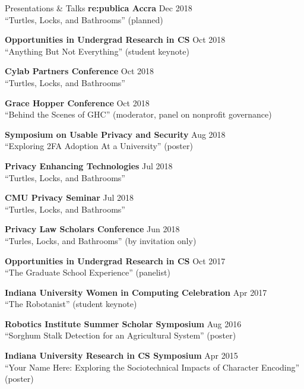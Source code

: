 \documentclass{resume} %
\begin{document}
\begin{rSection}{Presentations \& Talks}
	{\bf re:publica Accra} \hfill Dec 2018 \\
		``Turtles, Locks, and Bathrooms'' (planned) 

	{\bf Opportunities in Undergrad Research in CS} \hfill Oct 2018 \\ 
		``Anything But Not Everything'' (student keynote)

	{\bf Cylab Partners Conference}  \hfill Oct 2018 \\ 
		``Turtles, Locks, and Bathrooms''

	{\bf Grace Hopper Conference} \hfill Oct 2018 \\ 
		``Behind the Scenes of GHC'' (moderator, panel on nonprofit governance)

	{\bf Symposium on Usable Privacy and Security} \hfill Aug 2018 \\ 
		``Exploring 2FA Adoption At a University'' (poster) 

	{\bf Privacy Enhancing Technologies} \hfill Jul 2018 \\ 
		``Turtles, Locks, and Bathrooms'' 

	{\bf CMU Privacy Seminar}  \hfill Jul 2018 \\ 
		``Turtles, Locks, and Bathrooms''

	{\bf Privacy Law Scholars Conference} \hfill Jun 2018 \\ 
		``Turles, Locks, and Bathrooms'' (by invitation only) 

	{\bf Opportunities in Undergrad Research in CS} \hfill Oct 2017 \\ 
		``The Graduate School Experience'' (panelist) \

	{\bf Indiana University Women in Computing Celebration} \hfill Apr 2017 \\ 
		``The Robotanist'' (student keynote) 

	{\bf Robotics Institute Summer Scholar Symposium} \hfill Aug 2016 \\ 
		``Sorghum Stalk Detection for an Agricultural System'' (poster) 

	{\bf Indiana University Research in CS Symposium} \hfill Apr 2015 \\
		``Your Name Here: Exploring the Sociotechnical Impacts of Character Encoding'' (poster)  

\end{rSection}
\end{document}
